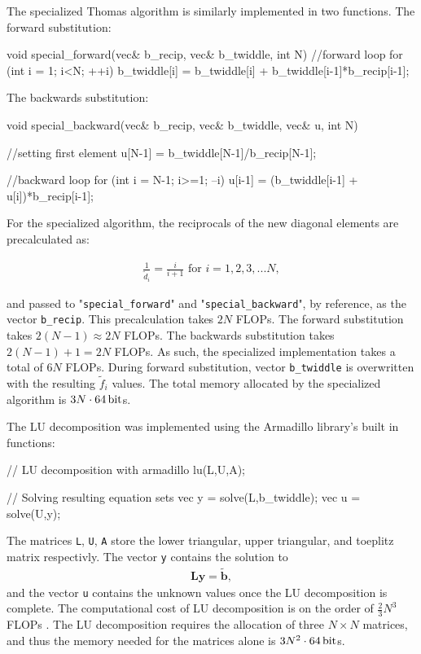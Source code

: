 \documentclass[english,notitlepage,reprint,nofootinbib]{revtex4-1}  %
\begin{document}
The specialized Thomas algorithm is similarly implemented in two functions. The forward substitution:
\begin{cpp}
void special_forward(vec& b_recip, vec& b_twiddle, int N)
{
  //forward loop
  for (int i = 1; i<N; ++i){
    b_twiddle[i] = b_twiddle[i] + b_twiddle[i-1]*b_recip[i-1];
  }
}
\end{cpp}
The backwards substitution:
\begin{cpp}
void special_backward(vec& b_recip, vec& b_twiddle, vec& u, int N)
{
  //setting first element
  u[N-1] = b_twiddle[N-1]/b_recip[N-1];

  //backward loop
  for (int i = N-1; i>=1; --i){
    u[i-1] = (b_twiddle[i-1] + u[i])*b_recip[i-1];
  }
}
\end{cpp}
For the specialized algorithm, the reciprocals of the new diagonal elements are precalculated as:

\begin{align*}
\frac{1}{\tilde{d}_{i}} = \frac{i}{i+1}\text{ for } i=1,2,3,...N,
\end{align*}

and passed to "\verb+special_forward+" and "\verb+special_backward+", by reference, as the vector \verb+b_recip+. This precalculation takes \(2N\) FLOPs. The forward substitution takes \(2(N-1)\approx 2N\) FLOPs. The backwards substitution takes \(2(N-1)+1 = 2N\) FLOPs. As such, the specialized implementation takes a total of \(6N\) FLOPs. During forward substitution, vector \verb+b_twiddle+ is overwritten with the resulting \(\tilde{f}_{i}\) values. The total memory allocated by the specialized algorithm is \(3N\cdot \SI{64}{\bit}\)s.

The LU decomposition was implemented using the Armadillo library's built in functions:
\begin{cpp}
  // LU decomposition with armadillo
  lu(L,U,A);

  // Solving resulting equation sets
  vec y = solve(L,b_twiddle);
  vec u = solve(U,y);
\end{cpp}
The matrices \verb+L+, \verb+U+, \verb+A+ store the lower triangular, upper triangular, and toeplitz matrix respectivly. The vector \verb+y+ contains the solution to
\begin{align*}
\textbf{Ly} = \tilde{\textbf{b}},
\end{align*}
and the vector \verb+u+ contains the unknown values once the LU decomposition is complete. The computational cost of LU decomposition is on the order of \(\frac{2}{3}N^{3}\) FLOPs \citep{Hjorth-Jensen2018}. The LU decomposition requires the allocation of three \(N\times N\) matrices, and thus the memory needed for the matrices alone is \(3N^{2} \cdot \SI{64}{\bit}\)s.
\end{document}

